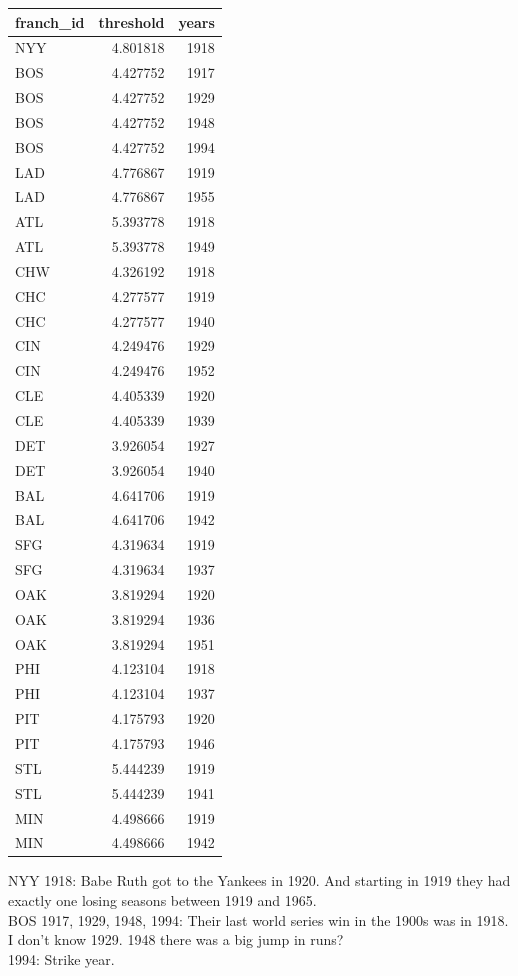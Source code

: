\documentclass[
  12pt,
]{article}
\begin{document}
\begin{longtable}[]{@{}lrr@{}}
\toprule()
franch\_id & threshold & years \\
\midrule()
\endhead
NYY & 4.801818 & 1918 \\
BOS & 4.427752 & 1917 \\
BOS & 4.427752 & 1929 \\
BOS & 4.427752 & 1948 \\
BOS & 4.427752 & 1994 \\
LAD & 4.776867 & 1919 \\
LAD & 4.776867 & 1955 \\
ATL & 5.393778 & 1918 \\
ATL & 5.393778 & 1949 \\
CHW & 4.326192 & 1918 \\
CHC & 4.277577 & 1919 \\
CHC & 4.277577 & 1940 \\
CIN & 4.249476 & 1929 \\
CIN & 4.249476 & 1952 \\
CLE & 4.405339 & 1920 \\
CLE & 4.405339 & 1939 \\
DET & 3.926054 & 1927 \\
DET & 3.926054 & 1940 \\
BAL & 4.641706 & 1919 \\
BAL & 4.641706 & 1942 \\
SFG & 4.319634 & 1919 \\
SFG & 4.319634 & 1937 \\
OAK & 3.819294 & 1920 \\
OAK & 3.819294 & 1936 \\
OAK & 3.819294 & 1951 \\
PHI & 4.123104 & 1918 \\
PHI & 4.123104 & 1937 \\
PIT & 4.175793 & 1920 \\
PIT & 4.175793 & 1946 \\
STL & 5.444239 & 1919 \\
STL & 5.444239 & 1941 \\
MIN & 4.498666 & 1919 \\
MIN & 4.498666 & 1942 \\
\bottomrule()
\end{longtable}

NYY 1918: Babe Ruth got to the Yankees in 1920. And starting in 1919
they had exactly one losing seasons between 1919 and 1965.\\
BOS 1917, 1929, 1948, 1994: Their last world series win in the 1900s was
in 1918.\\
I don't know 1929. 1948 there was a big jump in runs?\\
1994: Strike year.
\end{document}

